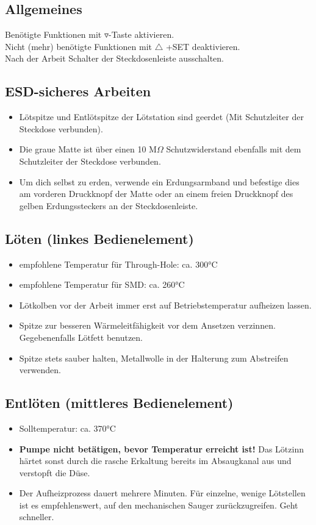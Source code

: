 \documentclass[a4paper]{article}
\begin{document}
\subsection{Allgemeines}
Benötigte Funktionen mit $\triangledown$-Taste aktivieren.\\
Nicht (mehr) benötigte Funktionen mit $\triangle$ +SET deaktivieren.\\
Nach der Arbeit Schalter der Steckdosenleiste ausschalten.
\subsection{ESD-sicheres Arbeiten}
\begin{itemize}
	\item Lötspitze und Entlötspitze der Lötstation sind geerdet (Mit Schutzleiter der Steckdose
	verbunden).
	\item Die graue Matte ist über einen 10 M$\Omega$ Schutzwiderstand ebenfalls mit dem Schutzleiter der
	Steckdose verbunden.
	\item Um dich selbst zu erden, verwende ein Erdungsarmband und befestige dies am vorderen
	Druckknopf der Matte oder an einem freien Druckknopf des gelben Erdungssteckers an der
	Steckdosenleiste.
\end{itemize}
\subsection{Löten (linkes Bedienelement)}
\begin{itemize}
	\item empfohlene Temperatur für Through-Hole: ca. 300°C
	\item empfohlene Temperatur für SMD: ca. 260°C
	\item Lötkolben vor der Arbeit immer erst auf Betriebstemperatur aufheizen lassen.
	\item Spitze zur besseren Wärmeleitfähigkeit vor dem Ansetzen verzinnen. Gegebenenfalls Lötfett
	benutzen.
   \item Spitze stets sauber halten, Metallwolle in der Halterung zum Abstreifen verwenden.
\end{itemize}
\subsection{Entlöten (mittleres Bedienelement)}
\begin{itemize}
	\item Solltemperatur: ca. 370°C
	\item \textbf{Pumpe nicht betätigen, bevor Temperatur erreicht ist!} Das Lötzinn härtet sonst durch die
	rasche Erkaltung bereits im Absaugkanal aus und verstopft die Düse.
	\item Der Aufheizprozess dauert mehrere Minuten. Für einzelne, wenige Lötstellen ist es
	empfehlenswert, auf den mechanischen Sauger zurückzugreifen. Geht schneller.
\end{itemize}
\end{document}
